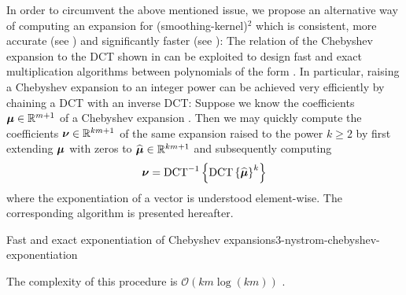 In order to circumvent the above mentioned issue, we propose an alternative way of computing
an expansion for (\gls{smoothing-kernel})$^2$ which is consistent,
more accurate (see ) and significantly
faster (see ):
The relation of the Chebyshev expansion to the \gls{DCT} shown in 
can be exploited to design fast and exact multiplication algorithms between polynomials
of the form  \cite[proposition~3.1]{baszenski1997cosine}.
In particular, raising a Chebyshev expansion to an integer power can be achieved
very efficiently by chaining a \gls{DCT} with an inverse \gls{DCT}:
Suppose we know the coefficients $\boldsymbol{\mu} \in \mathbb{R}^{m+1}$
of a Chebyshev expansion .
Then we may quickly compute the coefficients $\boldsymbol{\nu} \in \mathbb{R}^{km+1}$
of the same expansion raised to the power $k \geq 2$ by first extending
$\boldsymbol{\mu}$ with zeros to $\widehat{\boldsymbol{\mu}} \in \mathbb{R}^{km+1}$
and subsequently computing
\begin{equation}
    \boldsymbol{\nu} = \operatorname{DCT}^{-1}\left\{ \operatorname{DCT}\left\{\widehat{\boldsymbol{\mu}}\right\}^{k} \right\}
    \label{equ:3-nystrom-chebyshev-potentiate-coefficients}
\end{equation}
where the exponentiation of a vector is understood element-wise.
The corresponding algorithm is presented hereafter.
\begin{algo}{Fast and exact exponentiation of Chebyshev expansions}{3-nystrom-chebyshev-exponentiation}
    
\end{algo}
The complexity of this procedure is $\mathcal{O}(km \log(km))$ \cite{makhoul1980fct}.\\
\begin{table}[ht]
    \caption{Comparison of the runtime in milliseconds of three approaches with which the coefficients
    of the Chebyshev expansion of a function can be computed. We average over 7 runs of the
    algorithms and repeat these runs 100 times to form the mean and standard
    deviation which are given in the below table. We refer to the interpolation
    of (\gls{smoothing-kernel})$^{2}$ with \cite[algorithm~1]{lin2017randomized} as \enquote{quadrature},
    to the interpolation of (\gls{smoothing-kernel})$^{2}$ with  as \enquote{DCT},
    and finally to the consistent squaring algorithm  as \enquote{squaring}.
    For each algorithm, we interpolate a Gaussian \gls{smoothing-kernel} with \gls{smoothing-parameter} $=0.05$,
    at \gls{num-evaluation-points} $=1000$ points, for various values of \gls{chebyshev-degree}.}
    \label{tab:3-nystrom-timing-squared-interpolation}
    
\end{table}

